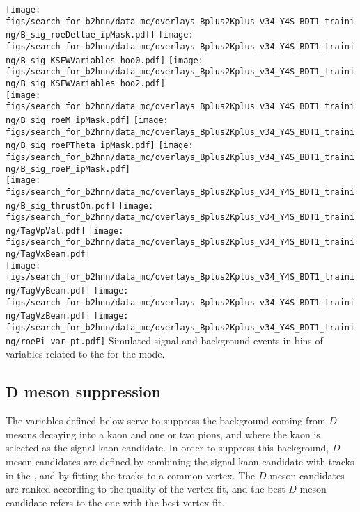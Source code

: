 {
\texttt{[image: figs/search\_for\_b2hnn/data\_mc/overlays\_Bplus2Kplus\_v34\_Y4S\_BDT1\_training/B\_sig\_roeDeltae\_ipMask.pdf]}
\texttt{[image: figs/search\_for\_b2hnn/data\_mc/overlays\_Bplus2Kplus\_v34\_Y4S\_BDT1\_training/B\_sig\_KSFWVariables\_hoo0.pdf]}
\texttt{[image: figs/search\_for\_b2hnn/data\_mc/overlays\_Bplus2Kplus\_v34\_Y4S\_BDT1\_training/B\_sig\_KSFWVariables\_hoo2.pdf]}\\
\texttt{[image: figs/search\_for\_b2hnn/data\_mc/overlays\_Bplus2Kplus\_v34\_Y4S\_BDT1\_training/B\_sig\_roeM\_ipMask.pdf]}
\texttt{[image: figs/search\_for\_b2hnn/data\_mc/overlays\_Bplus2Kplus\_v34\_Y4S\_BDT1\_training/B\_sig\_roePTheta\_ipMask.pdf]}
\texttt{[image: figs/search\_for\_b2hnn/data\_mc/overlays\_Bplus2Kplus\_v34\_Y4S\_BDT1\_training/B\_sig\_roeP\_ipMask.pdf]}\\
\texttt{[image: figs/search\_for\_b2hnn/data\_mc/overlays\_Bplus2Kplus\_v34\_Y4S\_BDT1\_training/B\_sig\_thrustOm.pdf]}
\texttt{[image: figs/search\_for\_b2hnn/data\_mc/overlays\_Bplus2Kplus\_v34\_Y4S\_BDT1\_training/TagVpVal.pdf]}
\texttt{[image: figs/search\_for\_b2hnn/data\_mc/overlays\_Bplus2Kplus\_v34\_Y4S\_BDT1\_training/TagVxBeam.pdf]}\\
\texttt{[image: figs/search\_for\_b2hnn/data\_mc/overlays\_Bplus2Kplus\_v34\_Y4S\_BDT1\_training/TagVyBeam.pdf]}
\texttt{[image: figs/search\_for\_b2hnn/data\_mc/overlays\_Bplus2Kplus\_v34\_Y4S\_BDT1\_training/TagVzBeam.pdf]}
\texttt{[image: figs/search\_for\_b2hnn/data\_mc/overlays\_Bplus2Kplus\_v34\_Y4S\_BDT1\_training/roePi\_var\_pt.pdf]}
}
{
Simulated signal and background events in bins of variables related to the \ROE for the \BKpnn mode.
\overlaytext
}
\subsection[$D$ meson suppression]{$\boldsymbol{D}$ meson suppression} \label{sec:var_dmeson_suppression}
The variables defined below serve to suppress the background coming from $D$ mesons decaying into a kaon and one or two pions, and where the kaon is selected as the signal kaon candidate.
In order to suppress this background, $D$ meson candidates are defined by combining the signal kaon candidate with tracks in the \ROE, and by fitting the tracks to a common vertex.
The $D$ meson candidates are ranked according to the quality of the vertex fit, and the best $D$ meson candidate refers to the one with the best vertex fit.

